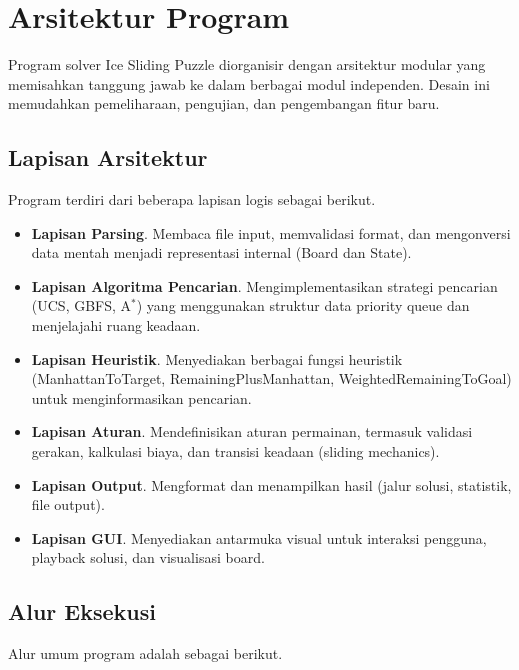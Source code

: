\section{Arsitektur Program}

Program solver Ice Sliding Puzzle diorganisir dengan arsitektur modular yang memisahkan tanggung jawab ke dalam berbagai modul independen. Desain ini memudahkan pemeliharaan, pengujian, dan pengembangan fitur baru.

\subsection{Lapisan Arsitektur}

Program terdiri dari beberapa lapisan logis sebagai berikut.

\begin{itemize}
    \item \textbf{Lapisan Parsing}. Membaca file input, memvalidasi format, dan mengonversi data mentah menjadi representasi internal (Board dan State).

    \item \textbf{Lapisan Algoritma Pencarian}. Mengimplementasikan strategi pencarian (UCS, GBFS, A$^\ast$) yang menggunakan struktur data priority queue dan menjelajahi ruang keadaan.

    \item \textbf{Lapisan Heuristik}. Menyediakan berbagai fungsi heuristik (ManhattanToTarget, RemainingPlusManhattan, WeightedRemainingToGoal) untuk menginformasikan pencarian.

    \item \textbf{Lapisan Aturan}. Mendefinisikan aturan permainan, termasuk validasi gerakan, kalkulasi biaya, dan transisi keadaan (sliding mechanics).

    \item \textbf{Lapisan Output}. Mengformat dan menampilkan hasil (jalur solusi, statistik, file output).

    \item \textbf{Lapisan GUI}. Menyediakan antarmuka visual untuk interaksi pengguna, playback solusi, dan visualisasi board.
\end{itemize}

\subsection{Alur Eksekusi}

Alur umum program adalah sebagai berikut.

